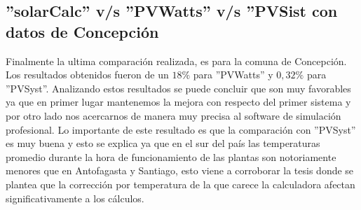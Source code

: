 \subsection{''solarCalc'' v/s ''PVWatts'' v/s ''PVSist con datos de Concepción}
\begin{table}[h!]
\caption{Comparación de software con datos de Concepción}
\end{table}
Finalmente la ultima comparación realizada, es para la comuna de Concepción. Los resultados obtenidos fueron de un $18\%$ para ''PVWatts'' y $0,32\%$ para ''PVSyst''. Analizando estos resultados se puede concluir que son muy favorables ya que en primer lugar mantenemos la mejora con respecto del primer sistema y por otro lado nos acercarnos de manera muy precisa al software de simulación profesional. Lo importante de este resultado es que la comparación con ''PVSyst'' es muy buena y esto se explica ya que en el sur del país las temperaturas promedio durante la hora de funcionamiento de las plantas son notoriamente menores que en Antofagasta y Santiago, esto viene a corroborar la tesis donde se plantea que la corrección por temperatura de la que carece la calculadora afectan significativamente a los cálculos.

